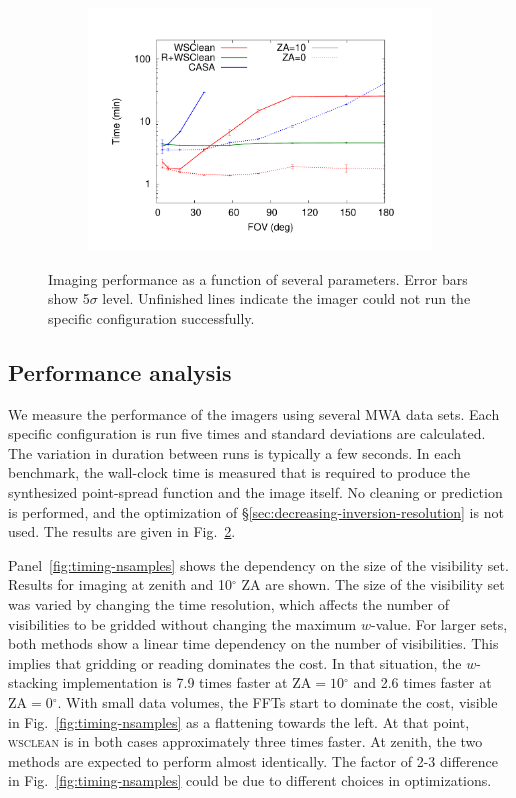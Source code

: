 \documentclass[useAMS,usenatbib]{mn2e}
\newcommand{\degree}{\ensuremath{^{\circ}}\xspace}
\begin{document}
\begin{figure}
\begin{subfigure}{.5\linewidth}
\includegraphics[width=\linewidth]{img/benchmark-fov/fov}
\caption{}\label{fig:timing-fov}%
\end{subfigure}%
\caption{Imaging performance as a function of several parameters. Error bars show 5$\sigma$ level. Unfinished lines indicate the imager could not run the specific configuration successfully.}\label{fig:timings}
\end{figure}

\subsection{Performance analysis}

We measure the performance of the imagers using several MWA data sets. Each specific configuration is run five times and standard deviations are calculated. The variation in duration between runs is typically a few seconds. In each benchmark, the wall-clock time is measured that is required to produce the synthesized point-spread function and the image itself. No cleaning or prediction is performed, and the optimization of \S\ref{sec:decreasing-inversion-resolution} is not used. The results are given in Fig.~\ref{fig:timings}.

Panel~\ref{fig:timing-nsamples} shows the dependency on the size of the visibility set. Results for imaging at zenith and 10\degree ZA are shown. The size of the visibility set was varied by changing the time resolution, which affects the number of visibilities to be gridded without changing the maximum $w$-value. For larger sets, both methods show a linear time dependency on the number of visibilities. This implies that gridding or reading dominates the cost. In that situation, the $w$-stacking implementation is 7.9 times faster at $\textrm{ZA}=10\degree$ and 2.6 times faster at $\textrm{ZA}=0\degree$. With small data volumes, the FFTs start to dominate the cost, visible in Fig.~\ref{fig:timing-nsamples} as a flattening towards the left. At that point, \textsc{wsclean} is in both cases approximately three times faster. At zenith, the two methods are expected to perform almost identically. The factor of 2-3 difference in Fig.~\ref{fig:timing-nsamples} could be due to different choices in optimizations.
\end{document}
